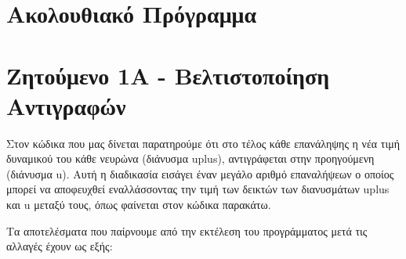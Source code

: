 \documentclass[a4paper,oneside,titlepage,10pt]{article}
\begin{document}


\lstset{basicstyle=\large,style=myCustomMatlabStyle}


\setlength{\parskip}{10pt}%

\section*{Ακολουθιακό Πρόγραμμα}

\section*{Ζητούμενο 1Α - Βελτιστοποίηση Αντιγραφών}

Στον κώδικα που μας δίνεται παρατηρούμε ότι στο τέλος κάθε επανάληψης η νέα τιμή δυναμικού του κάθε νευρώνα (διάνυσμα uplus), αντιγράφεται στην προηγούμενη (διάνυσμα u). Αυτή η διαδικασία εισάγει έναν μεγάλο αριθμό επαναλήψεων ο οποίος μπορεί να αποφευχθεί εναλλάσσοντας την τιμή των δεικτών των διανυσμάτων uplus και u μεταξύ τους, όπως φαίνεται στον κώδικα παρακάτω. 



\noindent Τα αποτελέσματα που παίρνουμε από την εκτέλεση του προγράμματος μετά τις αλλαγές έχουν ως εξής:

\setcounter{page}{1}
\end{document}
